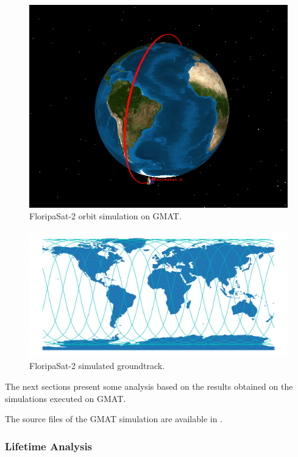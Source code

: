 \begin{figure}[!ht]
    \begin{center}
        \includegraphics[width=0.6\columnwidth]{figures/fsat2-gmat.png}
        \caption{FloripaSat-2 orbit simulation on GMAT.}
        \label{fig:fsat2-gmat}
    \end{center}
\end{figure}

\begin{figure}[!ht]
    \begin{center}
        \includegraphics[width=\columnwidth]{figures/fsat2-gmat-groundtrack.pdf}
        \caption{FloripaSat-2 simulated groundtrack.}
        \label{fig:fsat2-gmat-groundtrack}
    \end{center}
\end{figure}

The next sections present some analysis based on the results obtained on the simulations executed on GMAT.

The source files of the GMAT simulation are available in \cite{fsat2-mechanical}.

\subsubsection{Lifetime Analysis}

